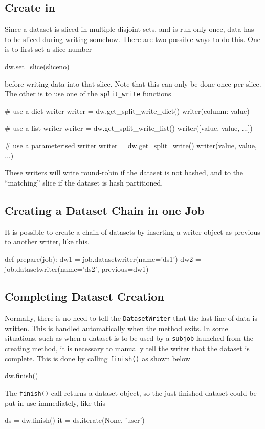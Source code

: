 \subsection{Create in \synthesis}
\label{sec:create_in_synthesis}
Since a dataset is sliced in multiple disjoint sets, and \synthesis is
run only once, data has to be sliced during writing somehow.  There
are two possible ways to do this.  One is to first set a slice number
\begin{python}
dw.set_slice(sliceno)
\end{python}
before writing data into that slice.  Note that this can only be done
once per slice.  The other is to use one of the \texttt{split\_write}
functions
\begin{python}
# use a dict-writer
writer = dw.get_split_write_dict()
writer({column: value})

# use a list-writer
writer = dw.get_split_write_list()
writer([value, value, ...])

# use a parameterised writer
writer = dw.get_split_write()
writer(value, value, ...)
\end{python}
These writers will write round-robin if the dataset is not hashed, and
to the ``matching'' slice if the dataset is hash partitioned.



\subsection{Creating a Dataset Chain in one Job}
It is possible to create a chain of datasets by inserting a writer
object as previous to another writer, like this.
\begin{python}
def prepare(job):
    dw1 = job.datasetwriter(name='ds1')
    dw2 = job.datasetwriter(name='ds2', previous=dw1)
\end{python}



\subsection{Completing Dataset Creation}
Normally, there is no need to tell the \texttt{DatasetWriter} that the
last line of data is written.  This is handled automatically when the
method exits.  In some situations, such as when a dataset is to be
used by a \texttt{subjob} launched from the creating method, it is
necessary to manually tell the writer that the dataset is complete.
This is done by calling \texttt{finish()} as shown below
\begin{python}
dw.finish()
\end{python}
The \texttt{finish()}-call returns a dataset object, so the just
finished dataset could be put in use immediately, like this
\begin{python}
ds = dw.finish()
it = ds.iterate(None, 'user')
\end{python}



